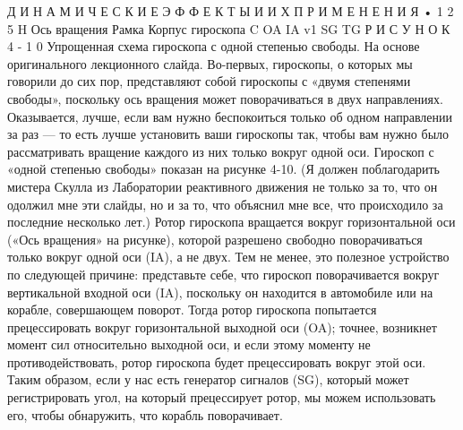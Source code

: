 \documentclass[10pt,oneside]{article}
\begin{document}
Д И Н А М И Ч Е С К И Е  Э Ф Ф Е К Т Ы  И  И Х  П Р И М Е Н Е Н И Я • 1 2 5 H Ось вращения Рамка Корпус гироскопа C OA IA v1 SG TG Р И С У Н О К  4 - 1 0 Упрощенная схема гироскопа с одной степенью свободы. На основе оригинального лекционного слайда. Во-первых, гироскопы, о которых мы говорили до сих пор, представляют собой гироскопы с «двумя степенями свободы», поскольку ось вращения может поворачиваться в двух направлениях. Оказывается, лучше, если вам нужно беспокоиться только об одном направлении за раз --- то есть лучше установить ваши гироскопы так, чтобы вам нужно было рассматривать вращение каждого из них только вокруг одной оси. Гироскоп с «одной степенью свободы» показан на рисунке 4-10. (Я должен поблагодарить мистера Скулла из Лаборатории реактивного движения не только за то, что он одолжил мне эти слайды, но и за то, что объяснил мне все, что происходило за последние несколько лет.) Ротор гироскопа вращается вокруг горизонтальной оси («Ось вращения» на рисунке), которой разрешено свободно поворачиваться только вокруг одной оси (IA), а не двух. Тем не менее, это полезное устройство по следующей причине: представьте себе, что гироскоп поворачивается вокруг вертикальной входной оси (IA), поскольку он находится в автомобиле или на корабле, совершающем поворот. Тогда ротор гироскопа попытается прецессировать вокруг горизонтальной выходной оси (OA); точнее, возникнет момент сил относительно выходной оси, и если этому моменту не противодействовать, ротор гироскопа будет прецессировать вокруг этой оси. Таким образом, если у нас есть генератор сигналов (SG), который может регистрировать угол, на который прецессирует ротор, мы можем использовать его, чтобы обнаружить, что корабль поворачивает.\par
\end{document}
